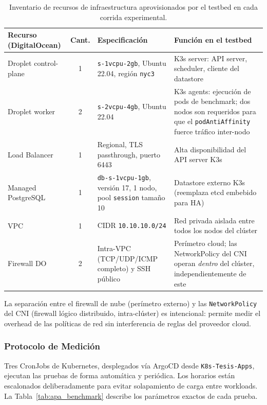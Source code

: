 \begin{table}[htbp]
\centering
\scriptsize
\caption{Inventario de recursos de infraestructura aprovisionados
         por el testbed en cada corrida experimental.}
\label{tab:apa_infra}
\begin{tabularx}{\textwidth}{|l|c|Y|Y|}
\hline
\textbf{Recurso (DigitalOcean)} & \textbf{Cant.}
  & \textbf{Especificación} & \textbf{Función en el testbed} \\
\hline
Droplet control-plane & 1
  & \texttt{s-1vcpu-2gb}, Ubuntu 22.04, región \texttt{nyc3}
  & K3s server: API server, scheduler, cliente del datastore \\
\hline
Droplet worker & 2
  & \texttt{s-2vcpu-4gb}, Ubuntu 22.04
  & K3s agents: ejecución de pods de benchmark; dos nodos son
    requeridos para que el \texttt{podAntiAffinity} fuerce tráfico
    inter-nodo \\
\hline
Load Balancer & 1
  & Regional, TLS passthrough, puerto 6443
  & Alta disponibilidad del API server K3s \\
\hline
Managed PostgreSQL & 1
  & \texttt{db-s-1vcpu-1gb}, versión 17, 1 nodo,
    pool \texttt{session} tamaño 10
  & Datastore externo K3s (reemplaza etcd embebido para HA) \\
\hline
VPC & 1
  & CIDR \texttt{10.10.10.0/24}
  & Red privada aislada entre todos los nodos del clúster \\
\hline
Firewall DO & 2
  & Intra-VPC (TCP/UDP/ICMP completo) y SSH público
  & Perímetro cloud; las NetworkPolicy del CNI operan
    \emph{dentro} del clúster, independientemente de este \\
\hline
\end{tabularx}
\end{table}

\noindent La separación entre el firewall de nube (perímetro externo)
y las \texttt{NetworkPolicy} del CNI (firewall lógico distribuido,
intra-clúster) es intencional: permite medir el overhead de las
políticas de red sin interferencia de reglas del proveedor cloud.

\subsubsection{Protocolo de Medición}

Tres CronJobs de Kubernetes, desplegados vía ArgoCD desde
\texttt{K8s-Tesis-Apps}, ejecutan las pruebas de forma automática
y periódica. Los horarios están escalonados deliberadamente para
evitar solapamiento de carga entre workloads. La
Tabla~\ref{tab:apa_benchmark} describe los parámetros exactos de
cada prueba.

